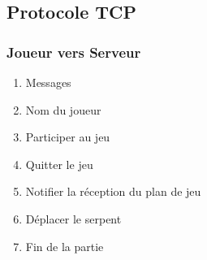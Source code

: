 \documentclass{report}
\begin{document}

		\subsection{Protocole TCP}
			\subsubsection{Joueur vers Serveur}
				\begin{enumerate}
					\item Messages
					 \label{messages}
					\item Nom du joueur
					 \label{nomJoueur}
					\item Participer au jeu
					 \label{participerJeu}
					\item Quitter le jeu
					 \label{quitterJeu}
					\item Notifier la réception du plan de jeu
					 \label{receptionPlanJeu}
					\item Déplacer le serpent
					 \label{deplacerSerpent}
					\item Fin de la partie
					 \label{finPartie}
					
				\end{enumerate}				
\end{document}
